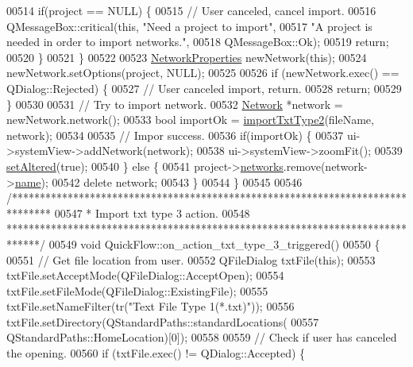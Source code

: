 \begin{DoxyCode}
00514     \textcolor{keywordflow}{if}(project == NULL) \{
00515       \textcolor{comment}{// User canceled, cancel import.}
00516       QMessageBox::critical(\textcolor{keyword}{this}, \textcolor{stringliteral}{"Need a project to import"},
00517                             \textcolor{stringliteral}{"A project is needed in order to import networks."},
00518                             QMessageBox::Ok);
00519       \textcolor{keywordflow}{return};
00520     \}
00521   \}
00522 
00523   \hyperlink{class_network_properties}{NetworkProperties} newNetwork(\textcolor{keyword}{this});
00524   newNetwork.setOptions(project, NULL);
00525 
00526   \textcolor{keywordflow}{if} (newNetwork.exec() == QDialog::Rejected) \{
00527     \textcolor{comment}{// User canceled import, return.}
00528     \textcolor{keywordflow}{return};
00529   \}
00530 
00531   \textcolor{comment}{// Try to import network.}
00532   \hyperlink{class_network}{Network} *network = newNetwork.network();
00533   \textcolor{keywordtype}{bool} importOk = \hyperlink{import_8cpp_aef466de21b145a0fdf215dd1a6409924}{importTxtType2}(fileName, network);
00534 
00535   \textcolor{comment}{// Impor success.}
00536   \textcolor{keywordflow}{if}(importOk) \{
00537     ui->systemView->addNetwork(network);
00538     ui->systemView->zoomFit();
00539     \hyperlink{group___window_ga4b63ea5ca52a9eea14db0a22b5a133f8}{setAltered}(\textcolor{keyword}{true});
00540   \} \textcolor{keywordflow}{else} \{
00541     project->\hyperlink{class_project_aa98126154cab59769a431668e6f17daf}{networks}.remove(network->\hyperlink{class_network_ab6643733a517f930c60b06f5ffd78186}{name});
00542     \textcolor{keyword}{delete} network;
00543   \}
00544 \}
00545 
00546 \textcolor{comment}{/*******************************************************************************}
00547 \textcolor{comment}{ * Import txt type 3 action.}
00548 \textcolor{comment}{ ******************************************************************************/}
00549 \textcolor{keywordtype}{void} QuickFlow::on\_action\_txt\_type\_3\_triggered()
00550 \{
00551   \textcolor{comment}{// Get file location from user.}
00552   QFileDialog txtFile(\textcolor{keyword}{this});
00553   txtFile.setAcceptMode(QFileDialog::AcceptOpen);
00554   txtFile.setFileMode(QFileDialog::ExistingFile);
00555   txtFile.setNameFilter(tr(\textcolor{stringliteral}{"Text File Type 1(*.txt)"}));
00556   txtFile.setDirectory(QStandardPaths::standardLocations(
00557                          QStandardPaths::HomeLocation)[0]);
00558 
00559   \textcolor{comment}{// Check if user has canceled the opening.}
00560   \textcolor{keywordflow}{if} (txtFile.exec() != QDialog::Accepted) \{

\end{DoxyCode}
